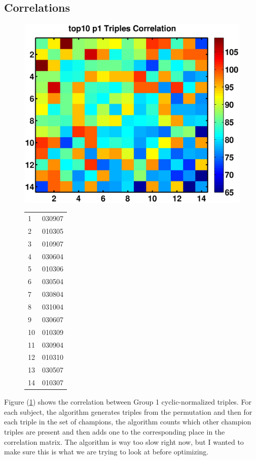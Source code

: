 \documentclass[11pt]{article}
\begin{document}
\subsection{Correlations}
\begin{figure}
\label{fig:corr1}
\includegraphics[width=.5\textwidth]{pictures/top10_p1_trips_corr.eps}
\begin{tabular}{|l|l|}
\hline
1&030907\\
2&010305\\
3&010907\\
4&030604\\
5&010306\\
6&030504\\
7&030804\\
8&031004\\
9&030607\\
10&010309\\
11&030904\\
12&010310\\
13&030507\\
14&010307\\
\hline
\end{tabular}
\caption{}
\end{figure}
Figure (\ref{fig:corr1}) shows the correlation between Group 1 cyclic-normalized triples. For each subject, the algorithm generates triples from the permutation and then for each triple in the set of champions, the algorithm counts which other champion triples are present and then adds one to the corresponding place in the correlation matrix. The algorithm is way too slow right now, but I wanted to make sure this is what we are trying to look at before optimizing.
\end{document}
